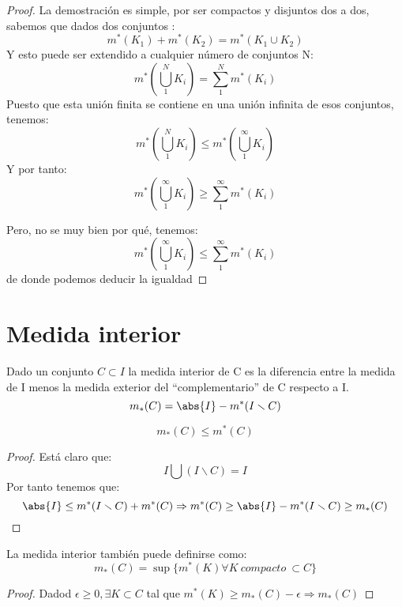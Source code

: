\documentclass{apuntes}
\begin{document}
\begin{proof}
La demostración es simple, por ser compactos y disjuntos dos a dos, sabemos que dados dos conjuntos :
\[m^*(K_1) + m^*(K_2) = m^*(K_1 \cup K_2)\]
Y esto puede ser extendido a cualquier número de conjuntos N:
\[m^*(\bigcup_1^{N}K_i) = \sum_1^{N}m^*(K_i)\]
Puesto que esta unión finita se contiene en una unión infinita de esos conjuntos, tenemos:
\[m^*(\bigcup_1^{N}K_i) \leq m^*(\bigcup_1^{\infty}K_i)\]
Y por tanto:
\[m^*(\bigcup_1^{\infty}K_i) \geq \sum_1^{\infty}m^*(K_i)\]

Pero, no se muy bien por qué, tenemos:
\[m^*(\bigcup_1^{\infty}K_i) \leq \sum_1^{\infty}m^*(K_i)\]
de donde podemos deducir la igualdad
\end{proof}

\section{Medida interior}
\begin{defn}
Dado un conjunto $C \subset I$ la medida interior de C es la diferencia entre la medida de I menos la medida exterior del ``complementario'' de C respecto a I.
\[m_*(C) = \abs{I} - m^*(I \smallsetminus C)\]
\end{defn}

\begin{theorem}
\[m_*(C) \leq m^*(C)\]
\end{theorem}
\begin{proof}
Está claro que:
\[I \bigcup (I \smallsetminus C) = I\]
Por tanto tenemos que:
\[\abs{I} \leq m^*(I \smallsetminus C) + m^*(C) \Rightarrow m^*(C) \geq \abs{I} - m^*(I \smallsetminus C) \geq m_*(C)\]
\end{proof}


\begin{lemma}
La medida interior también puede definirse como:
\[m_*(C) = \sup \lbrace  m^*(K) \forall K \ compacto \ \subset C \rbrace \]
\end{lemma}
\begin{proof}
Dadod $\epsilon \geq 0, \exists K \subset C$ tal que $m^*(K) \geq m_*(C) - \epsilon \Rightarrow m_*(C)$
\end{proof}
\end{document}
